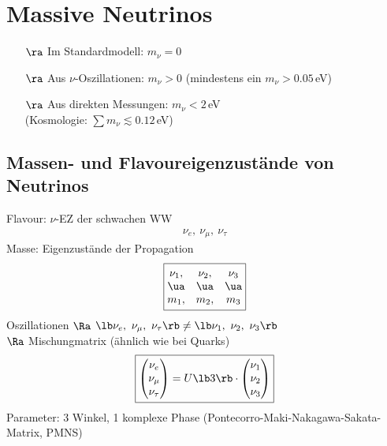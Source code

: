 
\chapter{Massive Neutrinos}
\begin{itemize}
\item[$\ra$] Im Standardmodell: $m_\nu = 0$
\item[$\ra$] Aus $\nu$-Oszillationen: $m_\nu >0$ (mindestens ein $m_\nu > 0.05$\,eV)
\item[$\ra$] Aus direkten Messungen: $m_\nu < 2$\,eV\\
(Kosmologie: $\sum m_\nu \lesssim 0.12$\,eV)
\end{itemize}
\section{Massen- und Flavoureigenzustände von Neutrinos}
Flavour: $\nu$-EZ der schwachen WW
\begin{align*}
\boxed{\nu_e, \ \nu_\mu, \ \nu_\tau}
\end{align*}
Masse: Eigenzustände der Propagation
\begin{align*}
\boxed{ \begin{matrix}
\nu_1, & \nu_2, & \nu_3\\
\ua & \ua & \ua\\
m_1, & m_2, & m_3
\end{matrix} }
\end{align*}
Oszillationen $\Ra$ $\lb  \nu_e, \ \nu_\mu, \ \nu_\tau\rb  \neq \lb \nu_1, \ \nu_2, \ \nu_3\rb $\\
$\Ra$ Mischungmatrix (ähnlich wie bei Quarks)
\begin{align}
\boxed{ \begin{pmatrix}
\nu_e \\ \nu_\mu \\ \nu_\tau 
\end{pmatrix} = U \lb 3\rb  \cdot \begin{pmatrix}
\nu_1 \\ \nu_2 \\ \nu_3
\end{pmatrix}}
\end{align}
Parameter: 3 Winkel, 1 komplexe Phase (Pontecorro-Maki-Nakagawa-Sakata-Matrix, PMNS)

